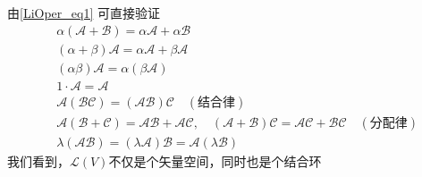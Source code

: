 由\autoref{LiOper_eq1} 可直接验证
\begin{equation}
\begin{aligned}
&\alpha(\mathcal{A+B})=\alpha\mathcal{A}+\alpha\mathcal{B}\\
&(\alpha+\beta)\mathcal{A}=\alpha\mathcal{A}+\beta\mathcal{A}\\
&(\alpha\beta)\mathcal{A}=\alpha(\beta\mathcal{A})\\
&1\cdot \mathcal{A}=\mathcal A\\
&\mathcal{A}(\mathcal{BC})=(\mathcal{AB})\mathcal C\quad(\text{结合律})\\
&\mathcal A(\mathcal{B+C})=\mathcal{AB+AC},\quad (\mathcal{A+B})\mathcal C=\mathcal{AC+BC}\quad(\text{分配律})\\
&\lambda(\mathcal{AB})=(\lambda\mathcal{A})\mathcal{B}=\mathcal{A}(\lambda \mathcal B)
\end{aligned}
\end{equation}
我们看到，$\mathcal{L}(V)$不仅是个矢量空间，同时也是个结合环



